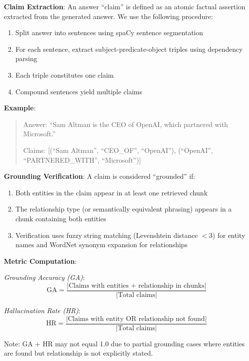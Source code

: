 \documentclass[conference]{IEEEtran}
\begin{document}
\textbf{Claim Extraction}: An answer ``claim'' is defined as an atomic factual assertion extracted from the generated answer. We use the following procedure:

\begin{enumerate}
    \item Split answer into sentences using spaCy sentence segmentation
    \item For each sentence, extract subject-predicate-object triples using dependency parsing
    \item Each triple constitutes one claim
    \item Compound sentences yield multiple claims
\end{enumerate}

\textbf{Example}:
\begin{quote}
Answer: ``Sam Altman is the CEO of OpenAI, which partnered with Microsoft.''

Claims: [(``Sam Altman'', ``CEO\_OF'', ``OpenAI''), (``OpenAI'', ``PARTNERED\_WITH'', ``Microsoft'')]
\end{quote}

\textbf{Grounding Verification}: A claim is considered ``grounded'' if:
\begin{enumerate}
    \item Both entities in the claim appear in at least one retrieved chunk
    \item The relationship type (or semantically equivalent phrasing) appears in a chunk containing both entities
    \item Verification uses fuzzy string matching (Levenshtein distance $< 3$) for entity names and WordNet synonym expansion for relationships
\end{enumerate}

\textbf{Metric Computation}:

\textit{Grounding Accuracy (GA)}:
\begin{equation}
    \text{GA} = \frac{|\text{Claims with entities + relationship in chunks}|}{|\text{Total claims}|}
\end{equation}

\textit{Hallucination Rate (HR)}:
\begin{equation}
    \text{HR} = \frac{|\text{Claims with entity OR relationship not found}|}{|\text{Total claims}|}
\end{equation}

Note: GA + HR may not equal 1.0 due to partial grounding cases where entities are found but relationship is not explicitly stated.
\end{document}
